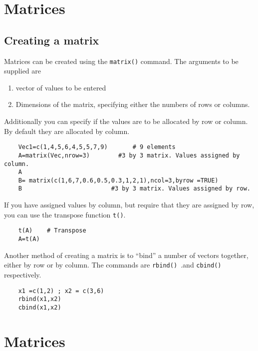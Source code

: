 
\section{Matrices}
\subsection{Creating a matrix}

Matrices can be created using the \texttt{matrix()} command. The arguments to be supplied are 
\begin{enumerate}
	\item vector of values to be entered
	\item  Dimensions of the matrix, specifying either the numbers of rows or columns.
\end{enumerate}

Additionally you can specify if the values are to be allocated by row or column. By default they are allocated by column.

\begin{framed}
	\begin{verbatim}
	Vec1=c(1,4,5,6,4,5,5,7,9)		# 9 elements
	A=matrix(Vec,nrow=3)		#3 by 3 matrix. Values assigned by column.
	A
	B= matrix(c(1,6,7,0.6,0.5,0.3,1,2,1),ncol=3,byrow =TRUE)
	B				          #3 by 3 matrix. Values assigned by row.
	\end{verbatim}
\end{framed}



If you have assigned values by column, but require that they are assigned by row, you can use the transpose function \texttt{t()}.
\begin{framed}
	\begin{verbatim}
	t(A)	# Transpose
	A=t(A)	
	\end{verbatim}
\end{framed}

Another method of creating a matrix is to “bind” a number of vectors together, either by row or by column. The commands are \texttt{rbind() }.and \texttt{cbind()} respectively.


\begin{framed}
	\begin{verbatim}
	x1 =c(1,2) ; x2 = c(3,6)
	rbind(x1,x2)
	cbind(x1,x2)
	\end{verbatim}
\end{framed}


\section{Matrices}
